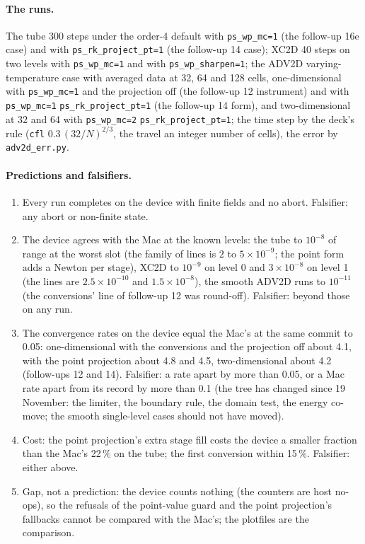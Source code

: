 \documentclass[11pt,a4paper]{article}
\newcommand{\code}[1]{\texttt{\small #1}}
\begin{document}
\paragraph{The runs.}  The tube 300 steps under the order-4 default
with \code{ps\_wp\_mc=1} (the follow-up 16e case) and with
\code{ps\_rk\_project\_pt=1} (the follow-up 14 case); XC2D 40 steps on two
levels with \code{ps\_wp\_mc=1} and with \code{ps\_wp\_sharpen=1}; the
ADV2D varying-temperature case with averaged data at 32, 64 and 128
cells, one-dimensional with \code{ps\_wp\_mc=1} and the projection off
(the follow-up 12 instrument) and with \code{ps\_wp\_mc=1}
\code{ps\_rk\_project\_pt=1} (the follow-up 14 form), and
two-dimensional at 32 and 64 with \code{ps\_wp\_mc=2}
\code{ps\_rk\_project\_pt=1}; the time step by the deck's rule
(\code{cfl} $0.3\,(32/N)^{2/3}$, the travel an integer number of cells),
the error by \code{adv2d\_err.py}.

\paragraph{Predictions and falsifiers.}
\begin{enumerate}[nosep]
\item Every run completes on the device with finite fields and no
      abort.  Falsifier: any abort or non-finite state.
\item The device agrees with the Mac at the known levels: the tube to
      $10^{-8}$ of range at the worst slot (the family of lines is
      $2$ to $5\times10^{-9}$; the point form adds a Newton per stage),
      XC2D to $10^{-9}$ on level 0 and $3\times10^{-8}$ on level 1 (the
      lines are $2.5\times10^{-10}$ and $1.5\times10^{-8}$), the smooth
      ADV2D runs to $10^{-11}$ (the conversions' line of follow-up 12
      was round-off).  Falsifier: beyond those on any run.
\item The convergence rates on the device equal the Mac's at the same
      commit to 0.05: one-dimensional with the conversions and the
      projection off about 4.1, with the point projection about 4.8
      and 4.5, two-dimensional about 4.2 (follow-ups 12 and 14).
      Falsifier: a rate apart by more than 0.05, or a Mac rate apart
      from its record by more than 0.1 (the tree has changed since
      19 November: the limiter, the boundary rule, the domain test,
      the energy co-move; the smooth single-level cases should not
      have moved).
\item Cost: the point projection's extra stage fill costs the device a
      smaller fraction than the Mac's 22\,\% on the tube; the first
      conversion within 15\,\%.  Falsifier: either above.
\item Gap, not a prediction: the device counts nothing (the counters
      are host no-ops), so the refusals of the point-value guard and the
      point projection's fallbacks cannot be compared with the Mac's;
      the plotfiles are the comparison.
\end{enumerate}
\end{document}
